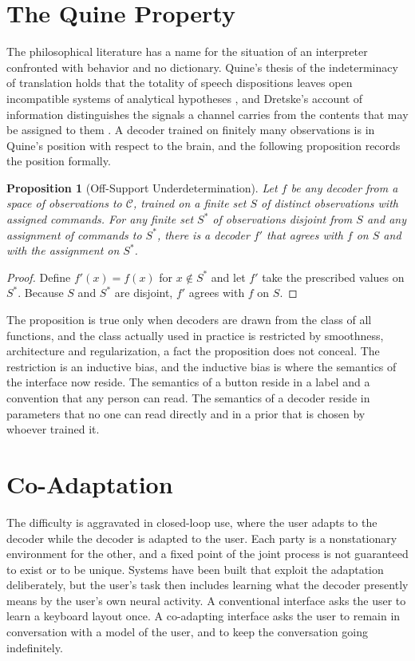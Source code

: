 \documentclass[11pt,twoside,openany]{book}
\newtheorem{proposition}[theorem]{Proposition}
\theoremstyle{definition}
\theoremstyle{remark}
\newcommand{\C}{\mathcal{C}}
\begin{document}
\section{The Quine Property}

The philosophical literature has a name for the situation of an interpreter confronted with behavior and no dictionary. Quine's thesis of the indeterminacy of translation holds that the totality of speech dispositions leaves open incompatible systems of analytical hypotheses \cite{quine1960}, and Dretske's account of information distinguishes the signals a channel carries from the contents that may be assigned to them \cite{dretske1981}. A decoder trained on finitely many observations is in Quine's position with respect to the brain, and the following proposition records the position formally.

\begin{proposition}[Off-Support Underdetermination]\label{prop:quine}
Let $f$ be any decoder from a space of observations to $\C$, trained on a finite set $S$ of distinct observations with assigned commands. For any finite set $S^{*}$ of observations disjoint from $S$ and any assignment of commands to $S^{*}$, there is a decoder $f'$ that agrees with $f$ on $S$ and with the assignment on $S^{*}$.
\end{proposition}
\begin{proof}
Define $f'(x)=f(x)$ for $x\notin S^{*}$ and let $f'$ take the prescribed values on $S^{*}$. Because $S$ and $S^{*}$ are disjoint, $f'$ agrees with $f$ on $S$.
\end{proof}

The proposition is true only when decoders are drawn from the class of all functions, and the class actually used in practice is restricted by smoothness, architecture and regularization, a fact the proposition does not conceal. The restriction is an inductive bias, and the inductive bias is where the semantics of the interface now reside. The semantics of a button reside in a label and a convention that any person can read. The semantics of a decoder reside in parameters that no one can read directly and in a prior that is chosen by whoever trained it.

\section{Co-Adaptation}

The difficulty is aggravated in closed-loop use, where the user adapts to the decoder while the decoder is adapted to the user. Each party is a nonstationary environment for the other, and a fixed point of the joint process is not guaranteed to exist or to be unique. Systems have been built that exploit the adaptation deliberately, but the user's task then includes learning what the decoder presently means by the user's own neural activity. A conventional interface asks the user to learn a keyboard layout once. A co-adapting interface asks the user to remain in conversation with a model of the user, and to keep the conversation going indefinitely.
\end{document}
